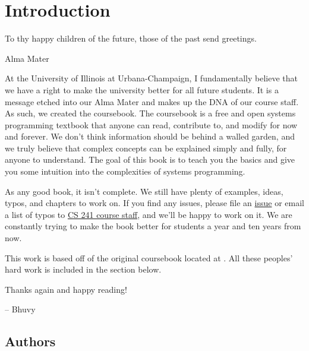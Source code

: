 \chapter{Introduction}

\epigraph{To thy happy children of the future, those of the past send greetings.}{Alma Mater}

At the University of Illinois at Urbana-Champaign, I fundamentally believe that we have a right to make the university better for all future students.
It is a message etched into our Alma Mater and makes up the DNA of our course staff.
As such, we created the coursebook.
The coursebook is a free and open systems programming textbook that anyone can read, contribute to, and modify for now and forever.
We don't think information should be behind a walled garden, and we truly believe that complex concepts can be explained simply and fully, for anyone to understand.
The goal of this book is to teach you the basics and give you some intuition into the complexities of systems programming.

As any good book, it isn't complete.
We still have plenty of examples, ideas, typos, and chapters to work on.
If you find any issues, please file an \href{https://github.com/illinois-cs241/coursebook/issues}{issue} or email a list of typos to \href{http://cs241.cs.illinois.edu/staff}{CS 241 course staff}, and we'll be happy to work on it.
We are constantly trying to make the book better for students a year and ten years from now.

This work is based off of the original coursebook located at .
All these peoples' hard work is included in the section below.

Thanks again and happy reading!

-- Bhuvy

\section{Authors}



